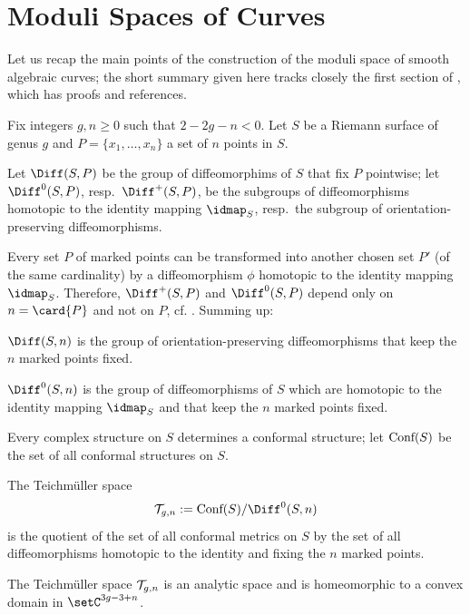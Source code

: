\section{Moduli Spaces of Curves}
\label{sec:moduli-spaces}

Let us recap the main points of the construction of the moduli space
of smooth algebraic curves; the short summary given here tracks
closely the first section of \cite{looijenga;cellular-decomposition},
which has proofs and references.

Fix integers $g,n\geq0$ such that $2 -2g - n < 0$. Let $S$ be a Riemann
surface of genus $g$ and $P = \{ x_1, \ldots, x_n \}$ a set of $n$ points
in $S$.  

Let $\Diff(S,P)$ be the group of diffeomorphims of $S$ that fix $P$
pointwise; let $\Diff^0(S,P)$, resp.~$\Diff^+(S,P)$, be the subgroups
of diffeomorphisms homotopic to the identity mapping $\idmap_S$,
resp.~the subgroup of orientation-preserving diffeomorphisms.

Every set $P$ of marked points can be transformed into another chosen
set $P'$ (of the same cardinality) by a diffeomorphism $\phi$
homotopic to the identity mapping $\idmap_S$.  Therefore, $\Diff^+(S,P)$
and $\Diff^0(S, P)$ depend only on $n = \card{P}$ and not on $P$,
cf. \cite{krushkal;riemann-surfaces}.  Summing up:
\begin{definition}\label{dfn:diff}
  $\Diff(S,n)$ is the group of orientation-preserving diffeomorphisms
  that keep the $n$ marked points fixed.

  $\Diff^0(S,n)$ is the group of diffeomorphisms of $S$ which are
  homotopic to the identity mapping $\idmap_S$ and that keep the $n$
  marked points fixed.
\end{definition}

Every complex structure  on $S$ determines a conformal structure; let
$\text{\rm Conf}(S)$ be the set of all conformal structures on $S$. 
\begin{definition}\label{dfn:teichmuller}
  The Teichm{\"u}ller space
  \begin{equation*}
    \T_{g,n} := \Conf(S) / \Diff^0(S, n)
  \end{equation*}
  is the quotient of the set of all conformal metrics on $S$ by the
  set of all diffeomorphisms homotopic to the identity and fixing the
  $n$ marked points.
\end{definition}
The Teichm{\"u}ller space $\mathcal{T}_{g,n}$ is an analytic space and is
homeomorphic to a convex domain in $\setC^{3g - 3 + n}$.

